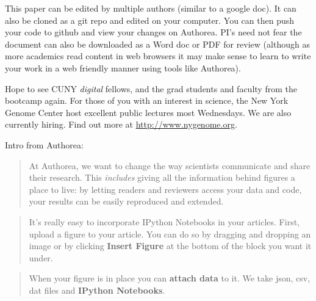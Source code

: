 This paper can be edited by multiple authors (similar to a google doc). It can also be cloned as a git repo and edited on your computer. You can then push your code to github and view your changes on Authorea. PI's need not fear the document can also be downloaded as a Word doc or PDF for review (although as more academics read content in web browsers it may make sense to learn to write your work in a web friendly manner using tools like Authorea).

Hope to see CUNY \textit{digital} fellows, and the grad students and faculty from the bootcamp again. For those of you with an interest in science, the New York Genome Center host excellent public lectures most Wednesdays. We are also currently hiring. Find out more at \href{http://}{http://www.nygenome.org}.

Intro from Authorea: 
\begin{quote}
At Authorea, we want to change the way scientists communicate and share their research. This \textit{includes} giving all the information behind figures a place to live: by letting readers and reviewers access your data and code, your results can be easily reproduced and extended.
\end{quote}

\begin{quote}
It's really easy to incorporate IPython Notebooks in your articles.  First, upload a figure to your article. You can do so by dragging and dropping an image or by clicking \textbf{Insert Figure} at the bottom of the block you want it under.  
\end{quote}

\begin{quote}
When your figure is in place you can \textbf{attach data} to it. We take json, csv, dat files and \textbf{IPython Notebooks}. 
\end{quote}